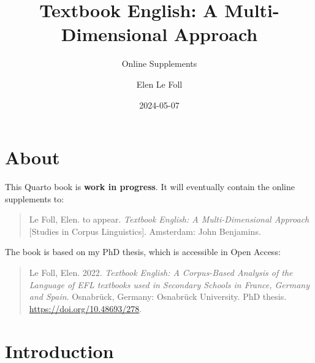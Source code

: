 \documentclass[
  letterpaper,
  DIV=11,
  numbers=noendperiod]{scrreprt}
\title{Textbook English: A Multi-Dimensional Approach}
\subtitle{Online Supplements}
\author{Elen Le Foll}
\date{2024-05-07}
\renewcommand*\contentsname{Table of contents}
\newcommand\contentsname{Table of contents}
\begin{document}
\maketitle

\renewcommand*\contentsname{Table of contents}
{
\hypersetup{linkcolor=}
\setcounter{tocdepth}{2}
\tableofcontents
}

\chapter*{About}\label{about}


\begin{tcolorbox}[enhanced jigsaw, title=\textcolor{quarto-callout-warning-color}{\faExclamationTriangle}\hspace{0.5em}{Warning}, toptitle=1mm, colframe=quarto-callout-warning-color-frame, opacityback=0, arc=.35mm, opacitybacktitle=0.6, toprule=.15mm, left=2mm, leftrule=.75mm, bottomrule=.15mm, breakable, bottomtitle=1mm, coltitle=black, rightrule=.15mm, titlerule=0mm, colback=white, colbacktitle=quarto-callout-warning-color!10!white]

This Quarto book is \textbf{work in progress}. It will eventually
contain the online supplements to:

\begin{quote}
Le Foll, Elen. to appear. \emph{Textbook English: A Multi-Dimensional
Approach} {[}Studies in Corpus Linguistics{]}. Amsterdam: John
Benjamins.
\end{quote}

\end{tcolorbox}

The book is based on my PhD thesis, which is accessible in Open Access:

\begin{quote}
Le Foll, Elen. 2022. \emph{Textbook English: A Corpus-Based Analysis of
the Language of EFL textbooks used in Secondary Schools in France,
Germany and Spain}. Osnabrück, Germany: Osnabrück University. PhD
thesis. \url{https://doi.org/10.48693/278}.
\end{quote}


\chapter{Introduction}\label{introduction}
\end{document}
